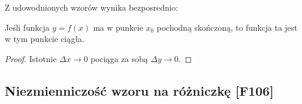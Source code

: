 	Z udowodnionych wzorów wynika bezposrednio:
	\begin{theorem}
		Jeśli funkcja $y= f\left( x \right) $ ma w punkcie $x_0$ pochodną skończoną, to funkcja ta jest w tym punkcie ciągła.
	\end{theorem} 
	\begin{proof}
		Istotnie $\Delta x \to 0$ pociąga za sobą $\Delta y \to 0.$
	\end{proof} 
\subsection{Niezmienniczość wzoru na różniczkę [F106]}

